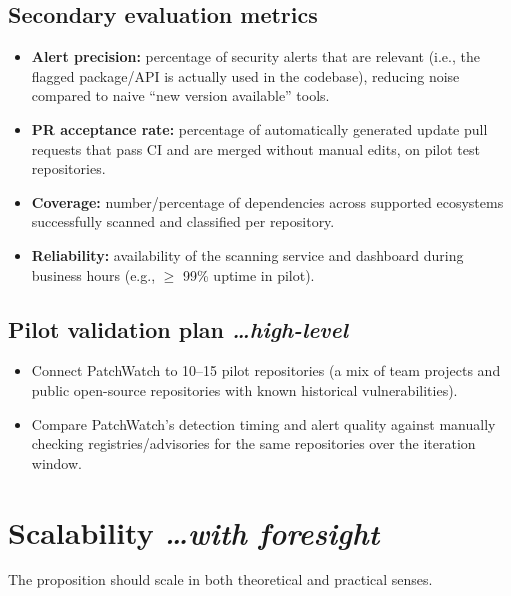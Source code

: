 \documentclass[11pt,a4paper]{article}
\newcommand{\BvrHint}[1]{%
  {\normalfont\normalsize\itshape\hfill #1}}
\begin{document}
\subsection{Secondary evaluation metrics}
\begin{itemize}[leftmargin=0.7cm]
    \item \textbf{Alert precision:} percentage of security alerts that are relevant (i.e., the flagged package/API is actually used in the codebase), reducing noise compared to naive ``new version available'' tools.
    \item \textbf{PR acceptance rate:} percentage of automatically generated update pull requests that pass CI and are merged without manual edits, on pilot test repositories.
    \item \textbf{Coverage:} number/percentage of dependencies across supported ecosystems successfully scanned and classified per repository.
    \item \textbf{Reliability:} availability of the scanning service and dashboard during business hours (e.g., $\ge$ 99\% uptime in pilot).
\end{itemize}

\subsection{Pilot validation plan %
\BvrHint{\ldots high-level}}
\begin{itemize}[leftmargin=0.7cm]
    \item Connect PatchWatch to 10--15 pilot repositories (a mix of team projects and public open-source repositories with known historical vulnerabilities).
    \item Compare PatchWatch's detection timing and alert quality against manually checking registries/advisories for the same repositories over the iteration window.
\end{itemize}

\section{Scalability %
\BvrHint{\ldots with foresight}}
The proposition should scale in both theoretical and practical senses.
\end{document}
